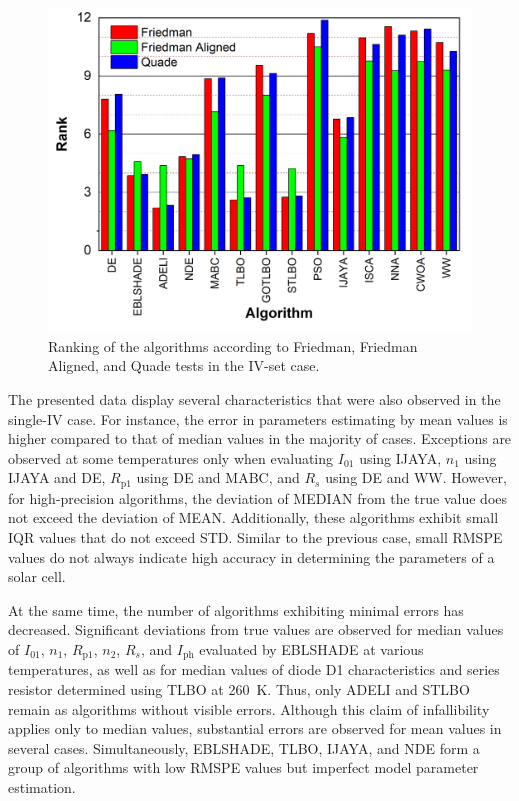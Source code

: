 \documentclass[a4paper,fleqn]{cas-dc}
\begin{document}
\begin{figure}[]
	\centering
		\includegraphics[width=1.0\columnwidth]{FigRankT}
	  \caption{Ranking of the algorithms according to Friedman, Friedman Aligned, and Quade tests in the IV-set case.}\label{figRankIVset}
\end{figure}

The presented data display several characteristics that were also observed in the single-IV case.
For instance, the error in parameters estimating by mean values is higher compared to that of median values in the majority of cases.
Exceptions are observed at some temperatures only when evaluating $I_{01}$ using IJAYA,
$n_1$ using IJAYA and DE,
$R_\mathrm{p1}$ using DE and MABC,
and $R_s$ using DE and WW.
However, for high-precision algorithms, the deviation of MEDIAN from the true value does not exceed the deviation of MEAN.
Additionally, these algorithms exhibit small IQR values that do not exceed STD.
Similar to the previous case, small RMSPE values do not always indicate high accuracy in determining the parameters of a solar cell.

At the same time, the number of algorithms exhibiting minimal errors has decreased.
Significant deviations from true values are observed for median values
of $I_{01}$, $n_{1}$, $R_\mathrm{p1}$, $n_2$, $R_s$, and $I_\mathrm{ph}$ evaluated by EBLSHADE at various temperatures,
as well as for median values of diode D1 characteristics and series resistor determined using TLBO at 260~K.
Thus, only ADELI and STLBO remain as algorithms without visible errors.
Although this claim of infallibility applies only to median values,
substantial errors are observed for mean values in several cases.
Simultaneously, EBLSHADE, TLBO, IJAYA, and NDE form a group of algorithms with low RMSPE values but imperfect model parameter estimation.
\end{document}
